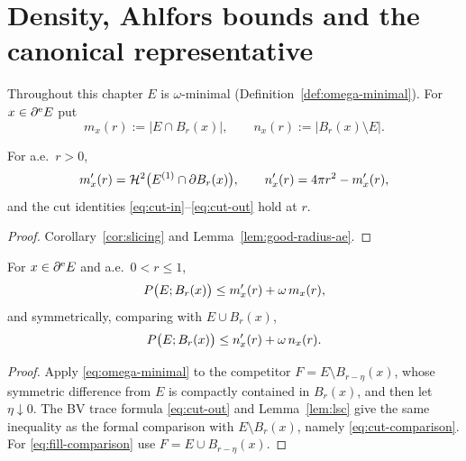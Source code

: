 \chapter{Density, Ahlfors bounds and the canonical representative}
\label{ch:density}

\begin{notation}\label{not:mx-nx}
Throughout this chapter $E$ is $\omega$-minimal
(Definition~\ref{def:omega-minimal}).  For $x\in\partial^{\mathrm e} E$ put
\[
  m_x(r):=|E\cap B_r(x)|,\qquad n_x(r):=|B_r(x)\setminus E| .
\]
\end{notation}

\begin{lemma}\label{lem:mx-derivative}
For a.e.\ $r>0$,
\begin{equation}\label{eq:mx-derivative}
  m_x'(r)=\mathcal H^2\bigl(E^{(1)}\cap\partial B_r(x)\bigr),
  \qquad
  n_x'(r)=4\pi r^2-m_x'(r),
\end{equation}
and the cut identities \eqref{eq:cut-in}--\eqref{eq:cut-out} hold at $r$.
\end{lemma}

\begin{proof}
Corollary~\ref{cor:slicing} and Lemma~\ref{lem:good-radius-ae}.
\end{proof}

\begin{lemma}\label{lem:cut-comparison}
For $x\in\partial^{\mathrm e} E$ and a.e.\ $0<r\le1$,
\begin{equation}\label{eq:cut-comparison}
  P\bigl(E;B_r(x)\bigr)\le m_x'(r)+\omega\,m_x(r),
\end{equation}
and symmetrically, comparing with $E\cup B_r(x)$,
\begin{equation}\label{eq:fill-comparison}
  P\bigl(E;B_r(x)\bigr)\le n_x'(r)+\omega\,n_x(r).
\end{equation}
\end{lemma}

\begin{proof}
Apply \eqref{eq:omega-minimal} to the competitor
$F=E\setminus B_{r-\eta}(x)$, whose symmetric difference from $E$ is compactly
contained in $B_r(x)$, and then let $\eta\downarrow0$.  The BV trace formula
\eqref{eq:cut-out} and Lemma~\ref{lem:lsc} give the same inequality as the
formal comparison with $E\setminus B_r(x)$, namely
\eqref{eq:cut-comparison}.  For \eqref{eq:fill-comparison} use
$F=E\cup B_{r-\eta}(x)$.
\end{proof}


